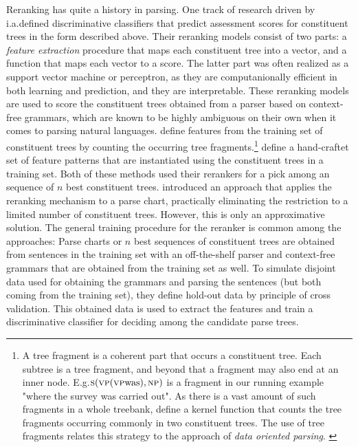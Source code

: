 \documentclass[../../document.tex]{subfiles}
\begin{document}
    Reranking has quite a history in parsing.
    One track of research driven by \citet{collins2001convolution,shen2003svm,collins05,huang2008forest} i.a.\@ defined discriminative classifiers that predict assessment scores for constituent trees in the form described above.
    Their reranking models consist of two parts:
        a \emph{feature extraction} procedure that maps each constituent tree into a vector, and a function that maps each vector to a score.
    The latter part was often realized as a support vector machine or perceptron, as they are computanionally efficient in both learning and prediction, and they are interpretable.
    These reranking models are used to score the constituent trees obtained from a parser based on context-free grammars, which are known to be highly ambiguous on their own when it comes to parsing natural languages.
    \citet{collins2001convolution, shen2003svm} define features from the training set of constituent trees by counting the occurring tree fragments.\footnote{
        A tree fragment is a coherent part that occurs a constituent tree.
        Each subtree is a tree fragment, and beyond that a fragment may also end at an inner node.
        E.g.\@ \(\textsc{s} (\textsc{vp} (\textsc{vp} \text{was}), \textsc{np})\) is a fragment in our running example "where the survey was carried out".
        As there is a vast amount of such fragments in a whole treebank, \citet{collins2001convolution} define a kernel function that counts the tree fragments occurring commonly in two constituent trees.
        The use of tree fragments relates this strategy to the approach of \emph{data oriented parsing}. \citep{Bod92}
    }
    \citet{collins05,charniak2005coarse} define a hand-craftet set of feature patterns that are instantiated using the constituent trees in a training set.
    Both of these methods used their rerankers for a pick among an sequence of \(n\) best constituent trees.
    \citet{huang2008forest} introduced an approach that applies the reranking mechanism to a parse chart, practically eliminating the restriction to a limited number of constituent trees.
    However, this is only an approximative solution.
    The general training procedure for the reranker is common among the approaches:
        Parse charts or \(n\) best sequences of constituent trees are obtained from sentences in the training set with an off-the-shelf parser and context-free grammars that are obtained from the training set as well.
        To simulate disjoint data used for obtaining the grammars and parsing the sentences (but both coming from the training set), they define hold-out data by principle of cross validation.
        This obtained data is used to extract the features and train a discriminative classifier for deciding among the candidate parse trees.
        
\end{document}
